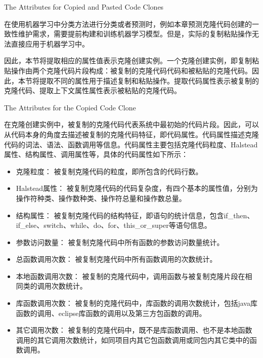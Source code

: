 {The Attributes for Copied and Pasted Code Clones}
\label{lab-creatingattribute}

在使用机器学习中分类方法进行分类或者预测时，例如本章预测克隆代码创建的一致性维护需求，需要提前构建和训练机器学习模型。但是，实际的复制粘贴操作无法直接应用于机器学习中。

因此，本节将提取相应的属性值表示克隆创建实例。一个克隆创建实例，即复制粘贴操作由两个克隆代码片段构成：被复制的克隆代码代码和被粘贴的克隆代码。因此，本节将提取不同的属性用于描述复制和粘贴操作。提取代码属性表示被复制的克隆代码、提取上下文属性属性表示被粘贴的克隆代码。

{The Attributes for the Copied Code Clone}

在克隆创建实例中，被复制的克隆代码代表系统中最初始的代码片段。因此，可以从代码本身的角度去描述被复制的克隆代码特征，即代码属性。代码属性描述克隆代码的词法、语法、函数调用等信息。代码属性主要包括克隆代码粒度、Halstead属性、结构属性、调用属性等，具体的代码属性如下所示：

\begin{itemize}
\item 
克隆粒度：
被复制克隆代码的粒度，即所包含的代码行数。
\item 
Halstead属性：
被复制克隆代码的代码复杂度，有四个基本的属性值，分别为操作符种类、操作数种类、操作符总量和操作数总量。
\item  
结构属性：
被复制克隆代码的结构特征，即语句的统计信息，包含{if\_then、if\_else、switch、while、do、for、this\_or\_super}等语句信息。
\item  
参数访问数量：
被复制克隆代码中所有函数的参数访问数量统计。
\item  
总函数调用次数：
被复制克隆代码中所有函数调用的次数统计。
\item  
本地函数调用次数：
被复制的克隆代码中，调用函数与被复制克隆片段在相同类的调用次数统计。
\item  
库函数调用次数：
被复制的克隆代码中，库函数的调用次数统计，包括java库函数的调用、eclipse库函数的调用以及第三方包函数的调用。
\item  
其它调用次数：
被复制的克隆代码中，既不是库函数调用、也不是本地函数调用的其它调用次数统计，如同项目内其它包函数调用或同包内其它类中的函数调用。
\end{itemize}

